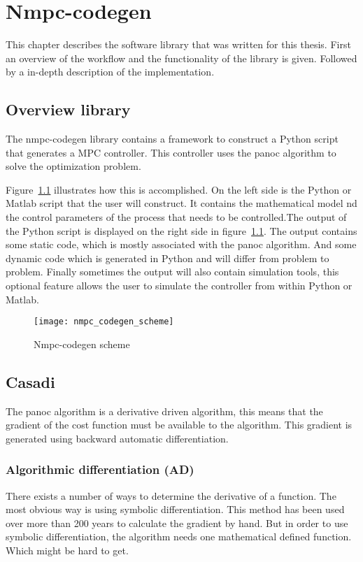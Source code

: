 \chapter{Nmpc-codegen}
This chapter describes the software library that was written for this thesis. First an overview of the workflow and the functionality of the library is given. Followed by a in-depth description of the implementation.
\section{Overview library}
The nmpc-codegen library contains a framework to construct a Python script that generates a MPC controller. This controller uses the panoc algorithm to solve the optimization problem.

Figure~\ref{fig:nmpc-codegen scheme} illustrates how this is accomplished. On the left side is the Python or Matlab script that the user will construct. It contains the mathematical model nd the control parameters of the process that needs to be controlled.The output of the Python script is displayed on the right side in figure~\ref{fig:nmpc-codegen scheme}. The output contains some static code, which is mostly associated with the panoc algorithm. And some dynamic code which is generated in Python and will differ from problem to problem. Finally sometimes the output will also contain simulation tools, this optional feature allows the user to simulate the controller from within Python or Matlab.
	\begin{figure}[H]
		\centering
		\texttt{[image: nmpc\_codegen\_scheme]}
		\caption{Nmpc-codegen scheme}
		\label{fig:nmpc-codegen scheme}
	\end{figure}

\section{Casadi}
The panoc algorithm is a derivative driven algorithm, this means that the gradient of the cost function must be available to the algorithm. This gradient is generated using backward automatic differentiation.

\subsection{Algorithmic differentiation (AD)}
There exists a number of ways to determine the derivative of a function. The most obvious way is using symbolic differentiation. This method has been used over more than 200 years to calculate the gradient by hand. But in order to use symbolic differentiation, the algorithm needs one mathematical defined function. Which might be hard to get.

